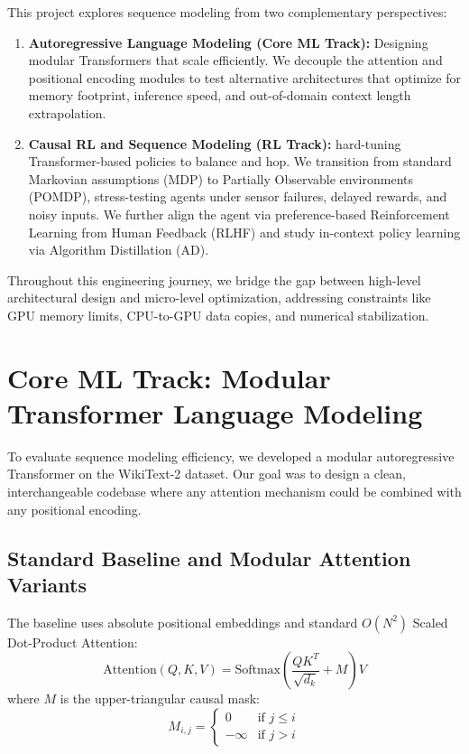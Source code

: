\documentclass[11pt,a4paper]{article}
\begin{document}
This project explores sequence modeling from two complementary perspectives:
\begin{enumerate}
    \item \textbf{Autoregressive Language Modeling (Core ML Track):} Designing modular Transformers that scale efficiently. We decouple the attention and positional encoding modules to test alternative architectures that optimize for memory footprint, inference speed, and out-of-domain context length extrapolation.
    \item \textbf{Causal RL and Sequence Modeling (RL Track):} hard-tuning Transformer-based policies to balance and hop. We transition from standard Markovian assumptions (MDP) to Partially Observable environments (POMDP), stress-testing agents under sensor failures, delayed rewards, and noisy inputs. We further align the agent via preference-based Reinforcement Learning from Human Feedback (RLHF) and study in-context policy learning via Algorithm Distillation (AD).
\end{enumerate}

Throughout this engineering journey, we bridge the gap between high-level architectural design and micro-level optimization, addressing constraints like GPU memory limits, CPU-to-GPU data copies, and numerical stabilization.

\newpage

\section{Core ML Track: Modular Transformer Language Modeling}
To evaluate sequence modeling efficiency, we developed a modular autoregressive Transformer on the WikiText-2 dataset. Our goal was to design a clean, interchangeable codebase where any attention mechanism could be combined with any positional encoding.

\subsection{Standard Baseline and Modular Attention Variants}
The baseline uses absolute positional embeddings and standard $O(N^2)$ Scaled Dot-Product Attention:
\begin{equation}
\text{Attention}(Q, K, V) = \text{Softmax}\left(\frac{QK^T}{\sqrt{d_k}} + M\right)V
\end{equation}
where $M$ is the upper-triangular causal mask:
\begin{equation}
M_{i,j} = \begin{cases} 0 & \text{if } j \le i \\ -\infty & \text{if } j > i \end{cases}
\end{equation}
\end{document}

